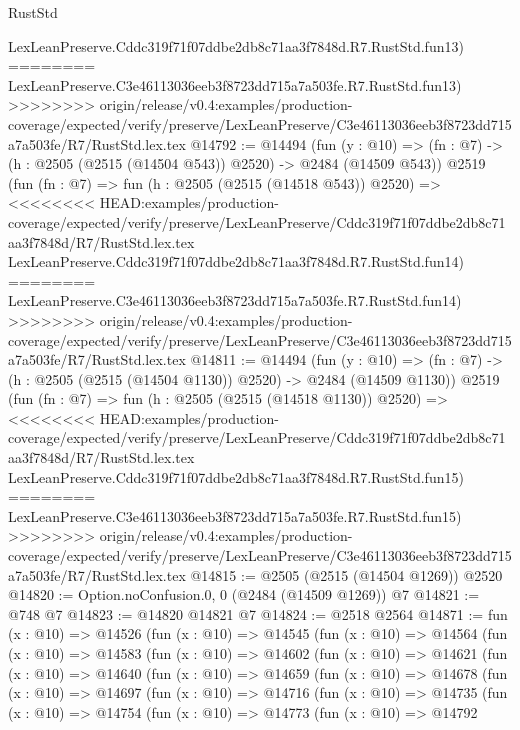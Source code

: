 \begin{lexlean}{RustStd}
\begin{coremodule}
{\begin{coremodule}
{{{{{{{{{{{{{{{{{{{{    LexLeanPreserve.Cddc319f71f07ddbe2db8c71aa3f7848d.R7.RustStd.fun13)
========
    LexLeanPreserve.C3e46113036eeb3f8723dd715a7a503fe.R7.RustStd.fun13)
>>>>>>>> origin/release/v0.4:examples/production-coverage/expected/verify/preserve/LexLeanPreserve/C3e46113036eeb3f8723dd715a7a503fe/R7/RustStd.lex.tex
@14792 := @14494
    (fun (y : @10) => (fn : @7) -> (h : @2505 (@2515 (@14504 @543)) @2520) -> @2484 (@14509 @543))
    @2519
    (fun (fn : @7) =>
    fun (h : @2505 (@2515 (@14518 @543)) @2520) =>
<<<<<<<< HEAD:examples/production-coverage/expected/verify/preserve/LexLeanPreserve/Cddc319f71f07ddbe2db8c71aa3f7848d/R7/RustStd.lex.tex
    LexLeanPreserve.Cddc319f71f07ddbe2db8c71aa3f7848d.R7.RustStd.fun14)
========
    LexLeanPreserve.C3e46113036eeb3f8723dd715a7a503fe.R7.RustStd.fun14)
>>>>>>>> origin/release/v0.4:examples/production-coverage/expected/verify/preserve/LexLeanPreserve/C3e46113036eeb3f8723dd715a7a503fe/R7/RustStd.lex.tex
@14811 := @14494
    (fun (y : @10) => (fn : @7) -> (h : @2505 (@2515 (@14504 @1130)) @2520) -> @2484 (@14509 @1130))
    @2519
    (fun (fn : @7) =>
    fun (h : @2505 (@2515 (@14518 @1130)) @2520) =>
<<<<<<<< HEAD:examples/production-coverage/expected/verify/preserve/LexLeanPreserve/Cddc319f71f07ddbe2db8c71aa3f7848d/R7/RustStd.lex.tex
    LexLeanPreserve.Cddc319f71f07ddbe2db8c71aa3f7848d.R7.RustStd.fun15)
========
    LexLeanPreserve.C3e46113036eeb3f8723dd715a7a503fe.R7.RustStd.fun15)
>>>>>>>> origin/release/v0.4:examples/production-coverage/expected/verify/preserve/LexLeanPreserve/C3e46113036eeb3f8723dd715a7a503fe/R7/RustStd.lex.tex
@14815 := @2505 (@2515 (@14504 @1269)) @2520
@14820 := Option.noConfusion.{0, 0} (@2484 (@14509 @1269)) @7
@14821 := @748 @7
@14823 := @14820 @14821 @7
@14824 := @2518 @2564
@14871 := fun (x : @10) =>
  @14526
    (fun (x : @10) =>
    @14545
      (fun (x : @10) =>
      @14564
        (fun (x : @10) =>
        @14583
          (fun (x : @10) =>
          @14602
            (fun (x : @10) =>
            @14621
              (fun (x : @10) =>
              @14640
                (fun (x : @10) =>
                @14659
                  (fun (x : @10) =>
                  @14678
                    (fun (x : @10) =>
                    @14697
                      (fun (x : @10) =>
                      @14716
                        (fun (x : @10) =>
                        @14735
                          (fun (x : @10) =>
                          @14754
                            (fun (x : @10) =>
                            @14773
                              (fun (x : @10) =>
                              @14792
}}}}}}}}}}}}}}}}}}}}
\end{coremodule}}
\end{coremodule}
\end{lexlean}
